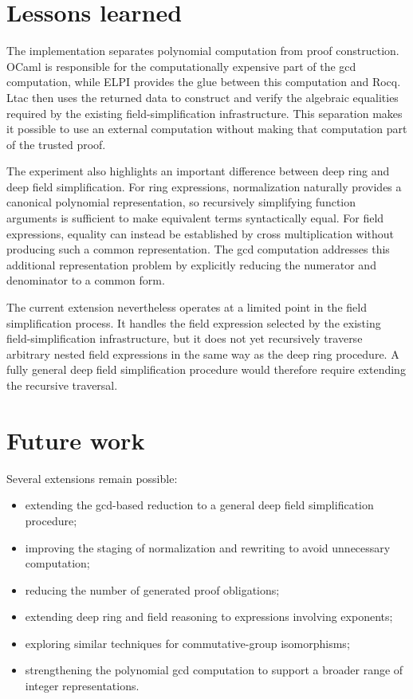\documentclass[11pt]{article}
\begin{document}
\section{Lessons learned}

The implementation separates polynomial computation from proof
construction. OCaml is responsible for the computationally expensive part of
the gcd computation, while ELPI provides the glue between this
computation and Rocq. Ltac then uses the
returned data to construct and verify the algebraic equalities required by the
existing field-simplification infrastructure. This separation makes it
possible to use an external computation without making that computation part
of the trusted proof.

The experiment also highlights an important difference between deep ring and
deep field simplification. For ring expressions, normalization naturally
provides a canonical polynomial representation, so recursively simplifying
function arguments is sufficient to make equivalent terms syntactically
equal. For field expressions, equality can instead be established by cross
multiplication without producing such a common representation. The gcd
computation addresses this additional representation problem by explicitly
reducing the numerator and denominator to a common form.

The current extension nevertheless operates at a limited point in the field
simplification process. It handles the field expression selected by the
existing field-simplification infrastructure, but it does not yet recursively
traverse arbitrary nested field expressions in the same way as the deep ring
procedure. A fully general deep field simplification procedure would therefore
require extending the recursive traversal.

\section{Future work}

Several extensions remain possible:

\begin{itemize}
\item extending the gcd-based reduction to a general deep field
simplification procedure;
\item improving the staging of normalization and rewriting to avoid
unnecessary computation;
\item reducing the number of generated proof obligations;
\item extending deep ring and field reasoning to expressions involving
exponents;
\item exploring similar techniques for commutative-group isomorphisms;
\item strengthening the polynomial gcd computation to support a broader
range of integer representations.
\end{itemize}
\end{document}
